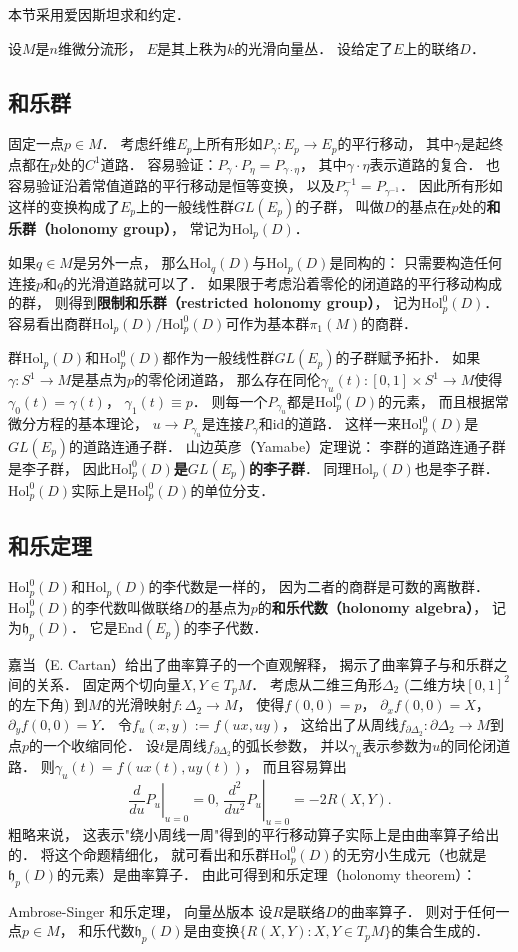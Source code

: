 

本节采用爱因斯坦求和约定．

设$M$是$n$维微分流形， $E$是其上秩为$k$的光滑向量丛． 设给定了$E$上的联络$D$．

\subsection{和乐群}
固定一点$p\in M$． 考虑纤维$E_p$上所有形如$P_\gamma:E_p\to E_p$的平行移动， 其中$\gamma$是起终点都在$p$处的$C^1$道路． 容易验证：$P_\gamma\cdot P_\eta=P_{\gamma\cdot\eta}$，
其中$\gamma\cdot\eta$表示道路的复合． 也容易验证沿着常值道路的平行移动是恒等变换， 以及$P_\gamma^{-1}=P_{\gamma^{-1}}$． 因此所有形如这样的变换构成了$E_p$上的一般线性群$GL(E_p)$的子群， 叫做$D$的基点在$p$处的\textbf{和乐群（holonomy group）}， 常记为$\text{Hol}_p(D)$． 

如果$q\in M$是另外一点， 那么$\text{Hol}_q(D)$与$\text{Hol}_p(D)$是同构的： 只需要构造任何连接$p$和$q$的光滑道路就可以了． 如果限于考虑沿着零伦的闭道路的平行移动构成的群， 则得到\textbf{限制和乐群（restricted holonomy group）}， 记为$\text{Hol}^0_p(D)$． 容易看出商群$\text{Hol}_p(D)/\text{Hol}_p^0(D)$可作为基本群$\pi_1(M)$的商群．

群$\text{Hol}_p(D)$和$\text{Hol}_p^0(D)$都作为一般线性群$GL(E_p)$的子群赋予拓扑． 如果$\gamma:S^1\to M$是基点为$p$的零伦闭道路， 那么存在同伦$\gamma_u(t):[0,1]\times S^1\to M$使得$\gamma_0(t)=\gamma(t)$， $\gamma_1(t)\equiv p$． 则每一个$P_{\gamma_u}$都是$\text{Hol}_p^0(D)$的元素， 而且根据常微分方程的基本理论， $u\to P_{\gamma_u}$是连接$P_\gamma$和$\text{id}$的道路． 这样一来$\text{Hol}_p^0(D)$是$GL(E_p)$的道路连通子群． 山边英彦（Yamabe）定理说： 李群的道路连通子群是李子群， 因此\textbf{$\text{Hol}_p^0(D)$是$GL(E_p)$的李子群}． 同理$\text{Hol}_p(D)$也是李子群． $\text{Hol}_p^0(D)$实际上是$\text{Hol}_p^0(D)$的单位分支．

\subsection{和乐定理}
$\text{Hol}_p^0(D)$和$\text{Hol}_p(D)$的李代数是一样的， 因为二者的商群是可数的离散群． $\text{Hol}_p^0(D)$的李代数叫做联络$D$的基点为$p$的\textbf{和乐代数（holonomy algebra）}， 记为$\mathfrak{h}_p(D)$．  它是$\text{End}(E_p)$的李子代数． 

嘉当（E. Cartan）给出了曲率算子的一个直观解释， 揭示了曲率算子与和乐群之间的关系． 固定两个切向量$X,Y\in T_pM$． 考虑从二维三角形$\Delta_2$ (二维方块$[0,1]^2$的左下角) 到$M$的光滑映射$f:\Delta_2\to M$， 使得$f(0,0)=p$， $\partial_xf(0,0)=X$， $\partial_yf(0,0)=Y$． 令$f_u(x,y):=f(ux,uy)$， 这给出了从周线$f_{\partial\Delta_2}:\partial\Delta_2\to M$到点$p$的一个收缩同伦． 设$t$是周线$f_{\partial\Delta_2}$的弧长参数， 并以$\gamma_u$表示参数为$u$的同伦闭道路． 则$\gamma_u(t)=f(ux(t),uy(t))$， 而且容易算出
$$
\left.\frac{d}{du}P_u\right|_{u=0}=0,\,\left.\frac{d^2}{du^2}P_u\right|_{u=0}=-2R(X,Y).
$$
粗略来说， 这表示"绕小周线一周"得到的平行移动算子实际上是由曲率算子给出的． 将这个命题精细化， 就可看出和乐群$\text{Hol}_p^0(D)$的无穷小生成元（也就是$\mathfrak{h}_p(D)$的元素）是曲率算子． 由此可得到和乐定理（holonomy theorem）：

\begin{theorem}{Ambrose-Singer 和乐定理， 向量丛版本}
设$R$是联络$D$的曲率算子． 则对于任何一点$p\in M$， 和乐代数$\mathfrak{h}_p(D)$是由变换$\{R(X,Y):X,Y\in T_pM\}$的集合生成的．
\end{theorem}
